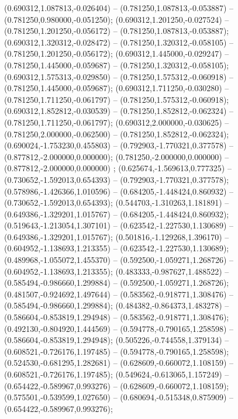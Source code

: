  (0.690312,1.087813,-0.026404) -- (0.781250,1.087813,-0.053887) -- (0.781250,0.980000,-0.051250);
 (0.690312,1.201250,-0.027524) -- (0.781250,1.201250,-0.056172) -- (0.781250,1.087813,-0.053887);
 (0.690312,1.320312,-0.028472) -- (0.781250,1.320312,-0.058105) -- (0.781250,1.201250,-0.056172);
 (0.690312,1.445000,-0.029247) -- (0.781250,1.445000,-0.059687) -- (0.781250,1.320312,-0.058105);
 (0.690312,1.575313,-0.029850) -- (0.781250,1.575312,-0.060918) -- (0.781250,1.445000,-0.059687);
 (0.690312,1.711250,-0.030280) -- (0.781250,1.711250,-0.061797) -- (0.781250,1.575312,-0.060918);
 (0.690312,1.852812,-0.030539) -- (0.781250,1.852812,-0.062324) -- (0.781250,1.711250,-0.061797);
 (0.690312,2.000000,-0.030625) -- (0.781250,2.000000,-0.062500) -- (0.781250,1.852812,-0.062324);
 (0.690024,-1.753230,0.455803) -- (0.792903,-1.770321,0.377578) -- (0.877812,-2.000000,0.000000);
 (0.781250,-2.000000,0.000000) -- (0.877812,-2.000000,0.000000) ;
 (0.625674,-1.569613,0.777325) -- (0.730652,-1.592013,0.654393) -- (0.792903,-1.770321,0.377578);
 (0.578986,-1.426366,1.010596) -- (0.684205,-1.448424,0.860932) -- (0.730652,-1.592013,0.654393);
 (0.544703,-1.310263,1.181891) -- (0.649386,-1.329201,1.015767) -- (0.684205,-1.448424,0.860932);
 (0.519643,-1.213054,1.307101) -- (0.623542,-1.227530,1.130689) -- (0.649386,-1.329201,1.015767);
 (0.501816,-1.129268,1.396170) -- (0.604952,-1.138693,1.213355) -- (0.623542,-1.227530,1.130689);
 (0.489968,-1.055072,1.455370) -- (0.592500,-1.059271,1.268726) -- (0.604952,-1.138693,1.213355);
 (0.483333,-0.987627,1.488522) -- (0.585494,-0.986660,1.299884) -- (0.592500,-1.059271,1.268726);
 (0.481507,-0.924692,1.497644) -- (0.583562,-0.918771,1.308476) -- (0.585494,-0.986660,1.299884);
 (0.484382,-0.864373,1.483278) -- (0.586604,-0.853819,1.294948) -- (0.583562,-0.918771,1.308476);
 (0.492130,-0.804920,1.444569) -- (0.594778,-0.790165,1.258598) -- (0.586604,-0.853819,1.294948);
 (0.505226,-0.744558,1.379134) -- (0.608521,-0.726176,1.197485) -- (0.594778,-0.790165,1.258598);
 (0.524530,-0.681295,1.282681) -- (0.628609,-0.660072,1.108159) -- (0.608521,-0.726176,1.197485);
 (0.549624,-0.613065,1.157249) -- (0.654422,-0.589967,0.993276) -- (0.628609,-0.660072,1.108159);
 (0.575501,-0.539599,1.027650) -- (0.680694,-0.515348,0.875909) -- (0.654422,-0.589967,0.993276);
